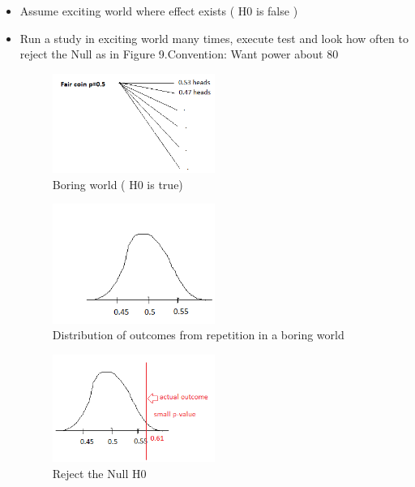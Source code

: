 \begin{itemize}
\item Assume exciting world where effect exists ( H0 is false )
\item Run a study in exciting world many times, execute test and look how often to reject the Null as in Figure 9.Convention: Want power about 80 %

\begin{figure}[ht]
  \begin{center}
    \includegraphics[width=0.5\textwidth]{figures/fig5.png}
    \caption{
    Boring world ( H0 is true) 
      }
    \label{fig:fig8}
  \end{center}
\end{figure}

 \begin{figure}[ht]
  \begin{center}
    \includegraphics[width=0.5\textwidth]{figures/fig6.png}
    \caption{
    Distribution of outcomes from repetition in a boring world
      }
    \label{fig:fig5}
  \end{center}
\end{figure}

 \begin{figure}[ht]
  \begin{center}
    \includegraphics[width=0.5\textwidth]{figures/fig7.png}
    \caption{
    Reject the Null H0
      }
    \label{fig:fig6}
  \end{center}
\end{figure}


\end{itemize}
